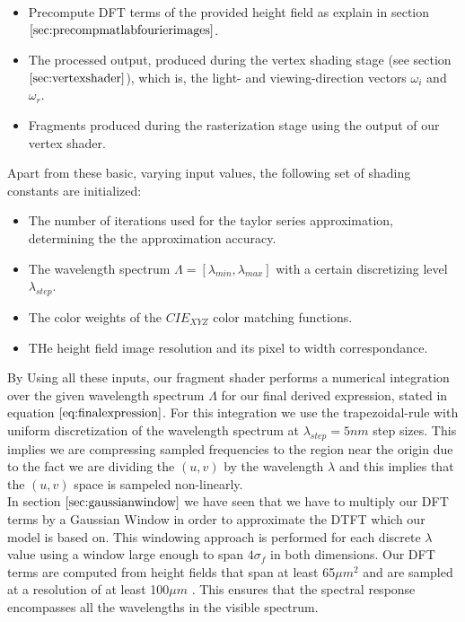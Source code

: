 \begin{itemize}
  \item Precompute DFT terms of the provided height field as explain in section $\ref{sec:precompmatlabfourierimages}$.
  \item The processed output, produced during the vertex shading stage (see section $\ref{sec:vertexshader}$), which is, the light- and viewing-direction vectors $\omega_i$ and $\omega_r$.
  \item Fragments produced during the rasterization stage using the output of our vertex shader.
\end{itemize}

Apart from these basic, varying input values, the following set of shading constants are initialized:

\begin{itemize}
  \item The number of iterations used for the taylor series approximation, determining the the approximation accuracy.
  \item The wavelength spectrum $\Lambda = [\lambda_{min}, \lambda_{max}]$ with a certain discretizing level $\lambda_{step}$.
  \item The color weights of the $CIE_{XYZ}$ color matching functions.
  \item THe height field image resolution and its pixel to width correspondance.
\end{itemize}

By Using all these inputs, our fragment shader performs a numerical integration over the given wavelength spectrum $\Lambda$ for our final derived expression, stated in equation $\ref{eq:finalexpression}$. For this integration we use the trapezoidal-rule with uniform discretization of the wavelength spectrum at $\lambda_{step}=5nm$ step sizes. This implies we are compressing sampled frequencies to the region near the origin due to the fact we are dividing the $(u,v)$ by the wavelength $\lambda$ and this implies that the $(u,v)$ space is sampeled non-linearly. \\

In section $\ref{sec:gaussianwindow}$ we have seen that we have to multiply our DFT terms by a Gaussian Window in order to approximate the DTFT which our model is based on. This windowing approach is performed for each discrete $\lambda$ value using a window large enough to span $4\sigma_f$ in both dimensions. Our DFT terms are computed from height fields that span at least 65$\mu m^2$ and are sampled at a resolution of at least 100$\mu m$ . 
This ensures that the spectral response encompasses all the wavelengths in the visible spectrum. \\

